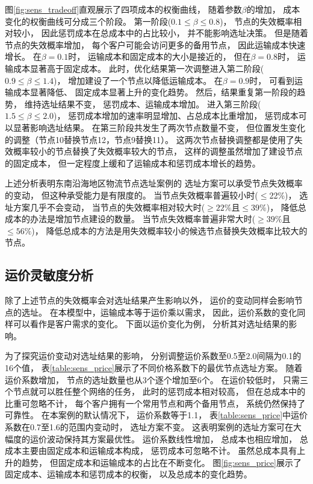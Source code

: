 图\ref{fig:sens_tradeoff}直观展示了四项成本的权衡曲线，
随着参数$\beta$的增加，
成本变化的权衡曲线可分成三个阶段。
第一阶段($0.1\le \beta \le 0.8$)，
节点的失效概率相对较小，
因此惩罚成本在总成本中的占比较小，
并不能影响选址决策。
但是随着节点的失效概率增加，
每个客户可能会访问更多的备用节点，
因此运输成本快速增长。
在$\beta=0.1$时，
运输成本和固定成本的大小是接近的，
但在$\beta=0.8$时，
运输成本显著高于固定成本。
此时，优化结果第一次调整进入第二阶段($0.9 \le \beta \le 1.4$)，
增加建设了一个节点以降低运输成本。
在$\beta=0.9$时，
可看到运输成本显著降低、
固定成本显著上升的变化趋势。
然后，结果重复第一阶段的趋势，
维持选址结果不变，
惩罚成本、运输成本增加。
进入第三阶段($1.5 \le \beta \le 2.0$)，
惩罚成本增加的速率明显增加、占总成本比重增加，
惩罚成本可以显著影响选址结果。
在第三阶段共发生了两次节点数量不变，
但位置发生变化的调整（节点10替换节点12，节点9替换11）。
这两次节点替换调整都是使用了失效概率较小的节点替换了失效概率较大的节点，
这样的调整虽然增加了建设节点的固定成本，
但一定程度上缓和了运输成本和惩罚成本增长的趋势。

上述分析表明东南沿海地区物流节点选址案例的
选址方案可以承受节点失效概率的变动，
但这种承受能力是有限度的。
当节点失效概率普遍较小时($\le$22\%)，
选址方案几乎不会变动，
当节点的失效概率相对较大时($\ge 22\%$且$\le 39\%$)，
降低总成本的办法是增加节点建设的数量。
当节点失效概率普遍非常大时($\ge 39\%$且$\le 56\%$)，
降低总成本的方法是用失效概率较小的候选节点替换失效概率比较大的节点。


\subsection{运价灵敏度分析}
除了上述节点的失效概率会对选址结果产生影响以外，
运价的变动同样会影响节点的选址。
在本模型中，运输成本等于运价乘以需求，
因此，运价系数的变化同样可以看作是客户需求的变化。
下面以运价变化为例，
分析其对选址结果的影响。

为了探究运价变动对选址结果的影响，
分别调整运价系数至0.5至2.0间隔为0.1的16个值，
表\ref{table:sens_price}展示了不同价格系数下的最优节点选址方案。
随着运价系数增加，
节点的选址数量也从3个逐个增加至6个。
在运价较低时，
只需三个节点就可以胜任整个网络的任务，
此时的惩罚成本相对较高，
但在总成本中的比重可忽略不计，
每个客户拥有一个常用节点和两个备用节点，
系统仍然保持了可靠性。
在本案例的默认情况下，
运价系数等于1.1，
表\ref{table:sens_price}中运价系数在0.7至1.6的范围内变动时，
选址方案不变。
这表明案例的选址方案可在大幅度的运价波动保持其方案最优性。
运价系数线性增加，
总成本也相应增加，
总成本主要由固定成本和运输成本构成，
惩罚成本可忽略不计。
虽然总成本具有上升的趋势，
但固定成本和运输成本的占比在不断变化。
图\ref{fig:sens_price}展示了固定成本、运输成本和惩罚成本的权衡，
以及总成本的变化趋势。



